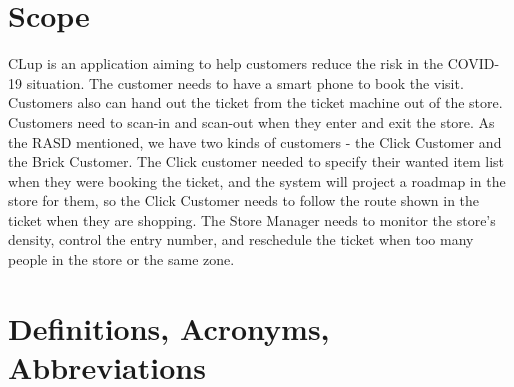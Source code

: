 \documentclass[a4paper,12pt]{report}
\begin{document}
\section{Scope}
CLup is an application aiming to help customers reduce the risk in the COVID-19 situation.
The customer needs to have a smart phone to book the visit. Customers also can hand out the ticket from the ticket machine out of the store.
Customers need to scan-in and scan-out when they enter and exit the store. As the RASD mentioned, we have two kinds of customers - the Click Customer and the Brick Customer.
The Click customer needed to specify their wanted item list when they were booking the ticket, and the system will project a roadmap in the store for them, so the Click Customer needs to follow the route shown in the ticket when they are shopping.
The Store Manager needs to monitor the store's density, control the entry number, and reschedule the ticket when too many people in the store or the same zone.


\section{Definitions, Acronyms, Abbreviations}
\end{document}
